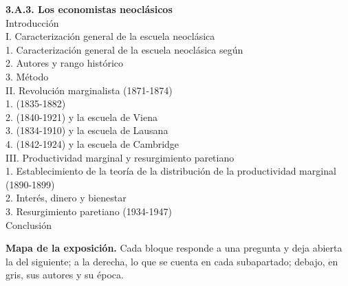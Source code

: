 \documentclass[11pt]{article}
\begin{document}
\begin{esquema}[unbreakable]
\textbf{3.A.3. Los economistas neoclásicos}\\[2pt]
Introducción\\
I. Caracterización general de la escuela neoclásica\\
\hspace*{1.5em}1. Caracterización general de la escuela neoclásica según \\
\hspace*{1.5em}2. Autores y rango histórico\\
\hspace*{1.5em}3. Método\\
II. Revolución marginalista (1871-1874)\\
\hspace*{1.5em}1.  (1835-1882)\\
\hspace*{1.5em}2.  (1840-1921) y la escuela de Viena\\
\hspace*{1.5em}3.  (1834-1910) y la escuela de Lausana\\
\hspace*{1.5em}4.  (1842-1924) y la escuela de Cambridge\\
III. Productividad marginal y resurgimiento paretiano\\
\hspace*{1.5em}1. Establecimiento de la teoría de la distribución de la productividad marginal (1890-1899)\\
\hspace*{1.5em}2. Interés, dinero y bienestar\\
\hspace*{1.5em}3. Resurgimiento paretiano (1934-1947)\\
Conclusión
\end{esquema}

\begin{anotaciones}
\textbf{Mapa de la exposición.} Cada bloque responde a una pregunta y deja abierta la del siguiente; a la derecha, lo que se cuenta en cada subapartado; debajo, en gris, sus autores y su época.
\begin{infografiacaja}
\caption{Mapa del tema: la pregunta de cada bloque, sus subapartados y el hilo que los une}\label{figu:mapa-tema}
\end{infografiacaja}
\end{anotaciones}
\end{document}

